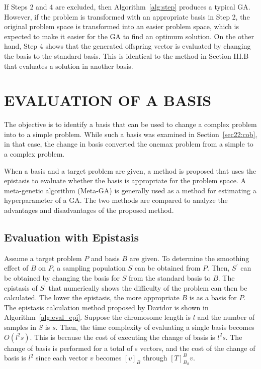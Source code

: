 If Steps 2 and 4 are excluded, then Algorithm~\ref{alg:step} produces a typical GA. However, if the problem is transformed with an appropriate basis in Step 2, the original problem space is transformed into an easier problem space, which is expected to make it easier for the GA to find an optimum solution. On the other hand, Step 4 shows that the generated offspring vector is evaluated by changing the basis to the standard basis. This is identical to the method in Section III.B that evaluates a solution in another basis.


\section{EVALUATION OF A BASIS} \label{sec4:eval_basis}
The objective is to identify a basis that can be used to change a complex problem into to a simple problem. While such a basis was examined in Section~\ref{sec22:cob}, in that case, the change in basis converted the onemax problem from a simple to a complex problem.

When a basis and a target problem are given, a method is proposed that uses the epistasis to evaluate whether the basis is appropriate for the problem space. A meta-genetic algorithm (Meta-GA) is generally used as a method for estimating a hyperparameter of a GA. The two methods are compared to analyze the advantages and disadvantages of the proposed method.

\subsection{Evaluation with Epistasis}
Assume a target problem $ P $ and basis $ B $ are given. To determine the smoothing effect of $ B $ on $ P $, a sampling population $ S $ can be obtained from $ P $. Then, $ S^\prime $ can be obtained by changing the basis for $ S $ from the standard basis to $ B $. The epistasis of $ S^\prime $ that numerically shows the difficulty of the problem can then be calculated. The lower the epistasis, the more appropriate $ B $ is as a basis for $ P $. The epistasis calculation method proposed by Davidor is shown in Algorithm~\ref{alg:eval_epi}. Suppose the chromosome length is $ l $ and the number of samples in $ S $ is $ s $. Then, the time complexity of evaluating a single basis becomes $ O\left(l^2s\right) $. This is because the cost of executing the change of basis is $ l^2s $. The change of basis is performed for a total of s vectors, and the cost of the change of basis is $ l^2 $ since each vector $ v $ becomes $ \left[v\right]_B $ through $ \left[T\right]_{B_S}^Bv $. 


